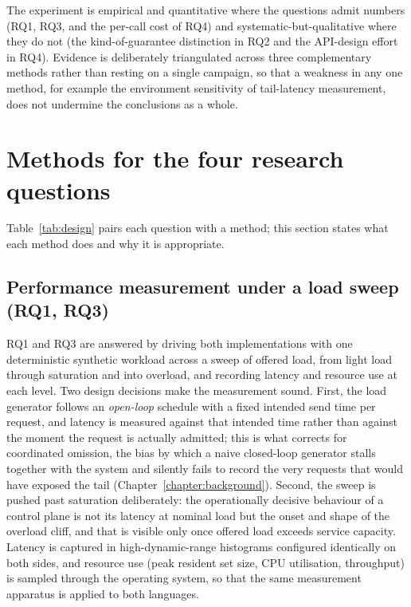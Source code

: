 \documentclass[english,twoside,openright,a4paper,censored,csm,software-track-2020]{HYthesisML}
\begin{document}
The experiment is empirical and quantitative where the questions admit numbers (RQ1, RQ3, and
the per-call cost of RQ4) and systematic-but-qualitative where they do not (the
kind-of-guarantee distinction in RQ2 and the API-design effort in RQ4). Evidence is
deliberately triangulated across three complementary methods rather than resting on a single
campaign, so that a weakness in any one method, for example the environment sensitivity of
tail-latency measurement, does not undermine the conclusions as a whole.

\section{Methods for the four research questions}
Table~\ref{tab:design} pairs each question with a method; this section states what each method
does and why it is appropriate.

\subsection{Performance measurement under a load sweep (RQ1, RQ3)}\label{sec:methodperf}
RQ1 and RQ3 are answered by driving both implementations with one deterministic synthetic
workload across a sweep of offered load, from light load through saturation and into overload,
and recording latency and resource use at each level. Two design decisions make the
measurement sound. First, the load generator follows an \emph{open-loop} schedule with a fixed
intended send time per request, and latency is measured against that intended time rather than
against the moment the request is actually admitted; this is what corrects for coordinated
omission, the bias by which a naive closed-loop generator stalls together with the system and
silently fails to record the very requests that would have exposed the tail
(Chapter~\ref{chapter:background}). Second, the sweep is pushed past saturation deliberately:
the operationally decisive behaviour of a control plane is not its latency at nominal load but
the onset and shape of the overload cliff, and that is visible only once offered load exceeds
service capacity. Latency is captured in high-dynamic-range histograms configured identically
on both sides, and resource use (peak resident set size, CPU utilisation, throughput) is
sampled through the operating system, so that the same measurement apparatus is applied to both
languages.
\end{document}
